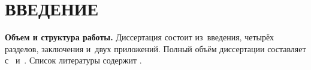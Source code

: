 \chapter*{ВВЕДЕНИЕ}							%

\newcommand{\actuality}{}
\newcommand{\aim}{\textbf{Целью}}
\newcommand{\tasks}{задачи}
\newcommand{\defpositions}{\textbf{Основные положения, выносимые на~защиту:}}
\newcommand{\novelty}{\textbf{Научная новизна:}}
\newcommand{\influence}{\textbf{Научная и практическая значимость}}
\newcommand{\reliability}{\textbf{Степень достоверности}}
\newcommand{\probation}{\textbf{Апробация работы.}}
\newcommand{\contribution}{\textbf{Личный вклад.}}
\newcommand{\publications}{\textbf{Публикации.}}



\textbf{Объем и структура работы.} Диссертация состоит из~введения, четырёх разделов, заключения и~двух приложений.
%
Полный объём диссертации составляет  
с~
и~. Список литературы содержит  
.
